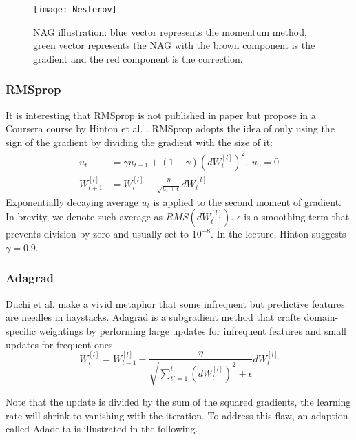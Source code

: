 \begin{figure}[H]
    \centering
    \texttt{[image: Nesterov]}
    \caption{\label{fig:Nesterov}NAG illustration: blue vector represents the 
    momentum method, green vector represents the NAG with the brown component 
    is the gradient and the red component is the correction.}
\end{figure}

\subsubsection{RMSprop}
\label{sssec:RMSprop}
It is interesting that RMSprop is not published in paper but propose in a 
Coursera course by Hinton et al. \parencite{rmsprop}. RMSprop adopts the idea
of only using the sign of the gradient by dividing the gradient with the size 
of it:
\begin{equation}
    \begin{split}
        u_t & = \gamma u_{t-1} + (1-\gamma)(dW_t^{[l]})^2,\ u_0 = 0 \\
        W_{t+1}^{[l]} & = W_{t}^{[l]} - \frac{\eta}{\sqrt{u_t+\epsilon}}dW_t^{[l]}
    \end{split}
\end{equation}
Exponentially decaying average $ u_t $ is applied to the second moment of gradient.
In brevity, we denote such average as $ RMS(dW_t^{[l]}) $.
$ \epsilon $ is a smoothing term that prevents division by zero and usually 
set to $ 10^{-8} $. In the lecture, Hinton suggests $ \gamma = 0.9 $.

\subsubsection{Adagrad}
Duchi et al. \parencite{duchi2011adaptive} make a vivid metaphor that some 
infrequent but predictive features are needles in haystacks. Adagrad is a 
subgradient method that crafts domain-specific weightings by performing large
updates for infrequent features and small updates for frequent ones.
\begin{equation}
    W_{t}^{[l]} = W_{t-1}^{[l]} - \frac{\eta}{\sqrt{\sum _{t'=1}^t(dW_{t'}^{[l]})^2} + 
        \epsilon}dW_{t}^{[l]}
\end{equation}
\par Note that the update is divided by the sum of the squared gradients, the 
learning rate will shrink to vanishing with the iteration. To address this flaw,
an adaption called Adadelta is illustrated in the following.

